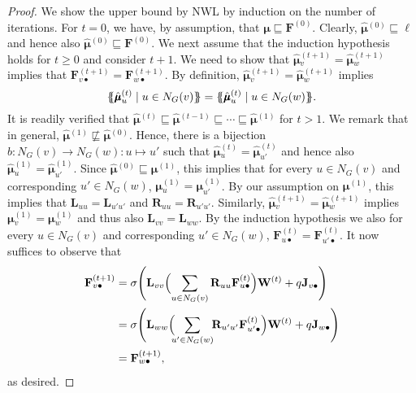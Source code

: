\begin{proof}
We show the upper bound by NWL by induction on the number of iterations. For $t=0$, we have, by assumption, that 
$\pmb{\mu}\sqsubseteq \mathbf{F}^{(0)}$. Clearly,
$\hat{\pmb{\mu}}{}^{(0)}\sqsubseteq \pmb{\ell}$ and hence also 
$\hat{\pmb{\mu}}{}^{(0)}\sqsubseteq\mathbf{F}^{(0)}$. We next assume that the induction hypothesis holds for $t\geq 0$ and consider $t+1$. We need to show that 
$\hat{\pmb{\mu}}{}^{(t+1)}_v=\hat{\pmb{\mu}}{}^{(t+1)}_w$ implies that $\mathbf{F}^{(t+1)}_{v\bullet}=\mathbf{F}^{(t+1)}_{w\bullet}$. By definition,
$\hat{\pmb{\mu}}{}^{(t+1)}_v=\hat{\pmb{\mu}}{}^{(t+1)}_w$ implies
$$
\ldbl \hat{\pmb{\mu}}{}^{(t)}_u \st u \in N_G(v) \rdbl=
 \ldbl \hat{\pmb{\mu}}{}^{(t)}_u \st u \in N_G(w) \rdbl.$$
It is readily verified that $\hat{\pmb{\mu}}{}^{(t)}\sqsubseteq \hat{\pmb{\mu}}{}^{(t-1)}\sqsubseteq \cdots\sqsubseteq \hat{\pmb{\mu}}{}^{(1)}$ for $t>1$. We remark that in general, $\hat{\pmb{\mu}}{}^{(1)}\not\sqsubseteq \hat{\pmb{\mu}}{}^{(0)}$.
Hence, there is a bijection $b:N_G(v)\to N_G(w):u\mapsto u'$ such that $\hat{\pmb{\mu}}{}^{(t)}_u=\hat{\pmb{\mu}}{}^{(t)}_{u'}$ and hence also 
 $\hat{\pmb{\mu}}{}^{(1)}_u=\hat{\pmb{\mu}}{}^{(1)}_{u'}$.
Since $\hat{\pmb{\mu}}{}^{(0)}\sqsubseteq \pmb{\mu}^{(1)}$, this implies that for every $u\in N_G(v)$ and corresponding $u'\in N_G(w)$,  $\pmb{\mu}{}^{(1)}_u=\pmb{\mu}{}^{(1)}_{u'}$.
By our assumption on $\pmb{\mu}^{(1)}$, this implies that
$\mathbf{L}_{uu}=\mathbf{L}_{u'u'}$ and $\mathbf{R}_{uu}=\mathbf{R}_{u'u'}$. Similarly, 
$\hat{\pmb{\mu}}{}^{(t+1)}_v=\hat{\pmb{\mu}}{}^{(t+1)}_w$  implies
$\pmb{\mu}{}^{(1)}_v=\pmb{\mu}{}^{(1)}_{w}$ and thus also $\mathbf{L}_{vv}=\mathbf{L}_{ww}$.
By the induction hypothesis we also for every $u\in N_G(v)$
   and corresponding $u'\in N_G(w)$, $\mathbf{F}^{(t)}_{u\bullet}=\mathbf{F}^{(t)}_{u'\bullet}$. It now suffices to observe that
  \begin{align*}
	  \mathbf{F}^{(t+1)}_{v\bullet}&=\sigma\Biggl(\mathbf{L}_{vv}\Bigl(\sum_{u\in N_G(v)} \mathbf{R}_{uu}\mathbf{F}^{(t)}_{u\bullet}\Bigr)\mathbf{W}^{(t)}+ q\mathbf{J}_{v\bullet}\Biggr)\\
	 & =\sigma\Biggl(\mathbf{L}_{ww}\Bigl(\!\!\sum_{u'\in N_G(w)}\!\! \mathbf{R}_{u'u'}\mathbf{F}^{(t)}_{u'\bullet}\Bigr)\mathbf{W}^{(t)}+ q\mathbf{J}_{w\bullet}\Biggr)\\
	  &=\mathbf{F}^{(t+1)}_{w\bullet},
\end{align*}
as desired.
\end{proof}


